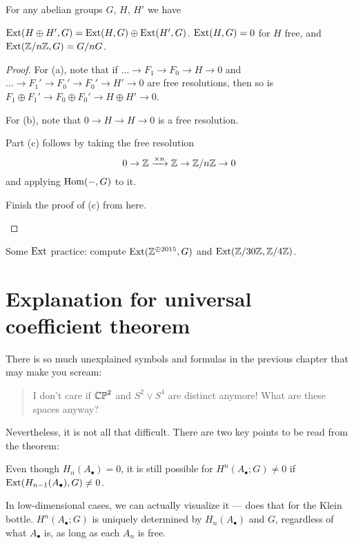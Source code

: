\begin{lemma}
	For any abelian groups $G$, $H$, $H'$ we have
	\begin{enumerate}[(a)]
		\ii $\operatorname{Ext}(H \oplus H', G) = \operatorname{Ext}(H, G) \oplus \operatorname{Ext}(H', G)$.
		\ii $\operatorname{Ext}(H,G) = 0$ for $H$ free, and
		\ii $\operatorname{Ext}(\mathbb Z/n\mathbb Z, G) = G / nG$.
	\end{enumerate}
\end{lemma}
\begin{proof}
	For (a), note that if $\dots \to F_1 \to F_0 \to H \to 0$
	and $\dots \to F_1' \to F_0' \to F_0' \to H' \to 0$ are free resolutions,
	then so is $F_1 \oplus F_1' \to F_0 \oplus F_0' \to H \oplus H' \to 0$.

	For (b), note that $0 \to H \to H \to 0$ is a free resolution.

	Part (c) follows by taking the free resolution
	\[ 0 \to \mathbb Z \xrightarrow{\times n} \mathbb Z \to \mathbb Z/n\mathbb Z \to 0 \]
	and applying $\operatorname{Hom}(-,G)$ to it.
	\begin{ques}
		Finish the proof of (c) from here. \qedhere
	\end{ques}
\end{proof}

\begin{ques}
	Some $\operatorname{Ext}$ practice: compute
	$\operatorname{Ext}(\mathbb Z^{\oplus 2015}, G)$ and $\operatorname{Ext}(\mathbb Z/30\mathbb Z, \mathbb Z/4\mathbb Z)$.
\end{ques}

\section{Explanation for universal coefficient theorem}

There is so much unexplained symbols and formulas in the previous chapter that may make you scream:
\begin{quote}
	I don't care if $\mathbb{CP}^2$ and $S^2 \vee S^4$ are distinct anymore! What are these spaces anyway?
\end{quote}
Nevertheless, it is not all that difficult. There are two key points to be read from the theorem:
\begin{itemize}
	\ii Even though $H_n(A_\bullet) = 0$, it is still possible for $H^n(A_\bullet; G) \neq 0$
	if $\operatorname{Ext}(H_{n-1}(A_\bullet), G) \neq 0$.

	In low-dimensional cases, we can actually visualize it --- 
	does that for the Klein bottle.
	\ii $H^n(A_\bullet; G)$ is uniquely determined by $H_n(A_\bullet)$ and $G$, regardless of what
	$A_\bullet$ is, as long as each $A_n$ is free.
\end{itemize}

